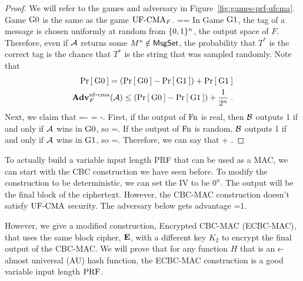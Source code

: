 \begin{proof}
	We will refer to the games and adversary in Figure~\ref{fig:games-prf-ufcma}. Game ${{\textnormal G}}0$ is the same as the game $\textnormal{UF-CMA}_F$.
	\bnm
	==
	\enm
	In Game ${{\textnormal G}}1$, the tag of a message is chosen uniformly at random from $\{0,1\}^n$, the output space of $F$. Therefore, even if ${\mathcal A}$ returns some $M^*\notin \textsf{MsgSet}$, the probability that $T^*$ is the correct tag is the chance that $T^*$ is the string that was sampled randomly.
	\bnm
	\leq {}
	\enm
	Note that 
	\begin{align*}
	\Pr\left[\: {{\textnormal G}}0 \:\right]=(\Pr\left[\: {{\textnormal G}}0 \:\right]-\Pr\left[\: {{\textnormal G}}1 \:\right]) + \Pr\left[\: {{\textnormal G}}1 \:\right]\\
	\mathbf{Adv}^{\mathrm{uf\mbox{-} cma}}_{F}({\mathcal A})\leq (\Pr\left[\: {{\textnormal G}}0 \:\right]-\Pr\left[\: {{\textnormal G}}1 \:\right]) + \frac{1}{2^n}\;.
	\end{align*}
	Next, we claim that 
	\bnm
	 =- = -\;.
	\enm
	First, if the output of $\textnormal{Fn}$ is real, then ${\mathcal B}$ outputs 1 if and only if ${\mathcal A}$ wins in ${{\textnormal G}}0$, so
	\bnm
	=\;.
	\enm
	If the output of $\textnormal{Fn}$ is random, ${\mathcal B}$ outputs 1 if and only if ${\mathcal A}$ wins in ${{\textnormal G}}1$, so 
	\bnm
	=\;.
	\enm
	Therefore, we can say that 
	\bnm
	 \le {} +  \;.
	\enm
\end{proof}

To actually build a variable input length PRF that can be used as a MAC, we can start with the CBC construction we have seen before.  To modify the construction to be deterministic, we can set the IV to be $0^n$. The output will be the final block of the ciphertext. However, the CBC-MAC construction doesn't satisfy $\textnormal{UF-CMA}$ security. The adversary below gets advantage 
\bnm
\AdvUFCMA{\CBC\text{-}\MAC}{\advA}=1\;.
\enm
\begin{figure}[h]
	\centering
{}
\end{figure}

However, we give a modified construction, Encrypted CBC-MAC (ECBC-MAC), that uses the same block cipher, ${\mbox{\bf E}}$, with a different key $K_2$ to encrypt the final output of the CBC-MAC.  We will prove that for any function $H$ that is an  $\epsilon$-almost universal (AU) hash function, the ECBC-MAC construction is a good variable input length $\textnormal{PRF}$. 

